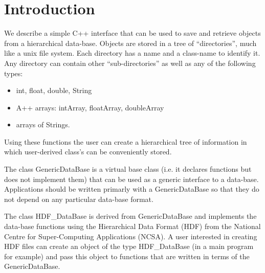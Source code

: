 \vfill\eject
\tableofcontents


\newcommand{\MGF}{Mapped\-Grid\-Function}
\newcommand{\GCF}{Grid\-Collection\-Function}
\newcommand{\CGF}{Composite\-Grid\-Function}

\newcommand{\MGO}{Mapped\-Grid\-Operators}
\newcommand{\GCO}{Grid\-Collection\-Operators}
\newcommand{\CGO}{Composite\-Grid\-Operators}

\newcommand{\primer}{/users/henshaw/res/primer}
\newcommand{\gf}{/users/henshaw/res/gf}
\newcommand{\figures}{../docFigures}
\newcommand{\mapping}{/users/henshaw/res/mapping}
\newcommand{\ogshow}{/users/henshaw/res/ogshow}
\newcommand{\oges}{/users/henshaw/res/oges}
\newcommand{\cguser}{/users/henshaw/cgap/cguser}


\section{Introduction}


We describe a simple C++ interface that can be used to save and retrieve objects
from a hierarchical data-base. Objects are stored in a tree of ``directories'',
much like a unix file system.
Each directory has a name and a class-name to identify it. Any directory can
contain other ``sub-directories'' as well as any of the following types:
\begin{itemize}
  \item int, float, double, String
  \item A++ arrays: intArray, floatArray, doubleArray
  \item arrays of Strings.
\end{itemize}
Using these functions the user can create a hierarchical tree of information in which
user-derived class's can be conveniently stored. 

The class {\ff GenericDataBase} is a virtual base class (i.e. it declares functions
but does not implement them) that can be used as a generic interface to a data-base.
Applications should be written primarly with a {\ff GenericDataBase} so that they
do not depend on any particular data-base format.

The class {\ff HDF\_DataBase} is derived from {\ff GenericDataBase} and implements
the data-base functions using the Hierarchical Data Format (HDF) from the National Centre
for Super-Computing Applications (NCSA). A user interested in creating HDF files
can create an object of the type {\ff HDF\_DataBase} (in a main program for example) and pass
this object to functions that are written in terms of the {\ff GenericDataBase}.

